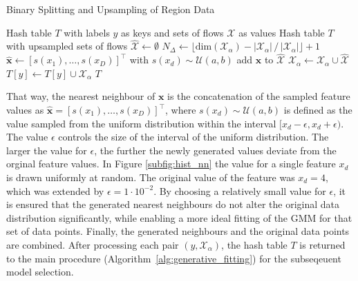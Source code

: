 \documentclass[../../main.tex]{subfiles}
\begin{document}
 \begin{algorithm}
    \caption{Binary Splitting and Upsampling of Region Data}
    \label{alg:upsampling}
 
    \begin{algorithmic}[1]
        \REQUIRE Hash table $T$ with labels $y$ as keys and sets of flows $\mathcal{X}$ as values
        \ENSURE Hash table $T$ with upsampled sets of flows
                \STATE $\hat{\mathcal{X}} \leftarrow \emptyset$
                \STATE $N_\Delta \leftarrow \lfloor \text{dim}(\mathcal{X}_\alpha) - |\mathcal{X}_\alpha| \, / \, |\mathcal{X}_\alpha| \rfloor + 1 $
                        \STATE $\hat{\bm{x}} \leftarrow [s(x_1), \dots, s(x_D)]^\top$ with $s(x_d) \sim \mathcal{U}(a, b)$
                        \STATE add $\hat{\bm{x}}$ to $\hat{\mathcal{X}}$
                    \ENDFOR
                \ENDFOR
                \STATE $\mathcal{X}_\alpha \leftarrow \mathcal{X}_\alpha \cup \hat{\mathcal{X}}$
                \STATE $T[y] \leftarrow T[y] \cup \mathcal{X}_\alpha$ 
            \ENDIF
        \ENDFOR
        \RETURN $T$
    \end{algorithmic}
 \end{algorithm}
 
 That way, the nearest neighbour of $\bm{x}$ is the concatenation of the sampled feature values as $\hat{\bm{x}} = [s(x_1), \dots, s(x_D)]^\top$, where $s(x_d) \sim \mathcal{U}(a, b)$ is defined as the value sampled from the uniform distribution within the interval $[x_d-\epsilon, x_d+\epsilon)$. The value $\epsilon$ controls the size of the interval of the uniform distribution. The larger the value for $\epsilon$, the further the newly generated values deviate from the orginal feature values. In Figure \ref{subfig:hist_nn} the value for a single feature $x_d$ is drawn uniformly at random. The original value of the feature was $x_d=4$, which was extended by $\epsilon=1\cdot10^{-2}$. By choosing a relatively small value for $\epsilon$, it is ensured that the generated nearest neighbours do not alter the original data distribution significantly, while enabling a more ideal fitting of the GMM for that set of data points. Finally, the generated neighbours and the original data points are combined. After processing each pair $(y, \mathcal{X}_\alpha)$, the hash table $T$ is returned to the main procedure (Algorithm~\ref{alg:generative_fitting}) for the subseqeuent model selection.
\end{document}
